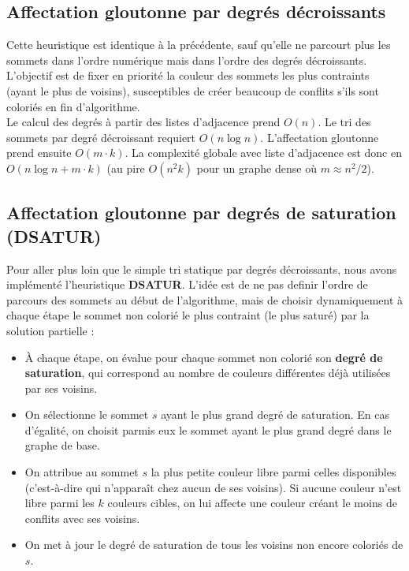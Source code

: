 \documentclass{article}
\begin{document}
\subsection{Affectation gloutonne par degrés décroissants}
Cette heuristique est identique à la précédente, sauf qu'elle ne parcourt plus les sommets dans l'ordre numérique mais dans l'ordre des degrés décroissants. L'objectif est de fixer en priorité la couleur des sommets les plus contraints (ayant le plus de voisins), susceptibles de créer beaucoup de conflits s'ils sont coloriés en fin d'algorithme.\\

Le calcul des degrés à partir des listes d'adjacence prend $O(n)$. Le tri des sommets par degré décroissant requiert $O(n \log n)$. L'affectation gloutonne prend ensuite $O(m \cdot k)$. La complexité globale avec liste d'adjacence est donc en $O(n \log n + m \cdot k)$ (au pire $O(n^2 k)$ pour un graphe dense où $m \approx n^2/2$).

\subsection{Affectation gloutonne par degrés de saturation (DSATUR)}
Pour aller plus loin que le simple tri statique par degrés décroissants, nous avons implémenté l'heuristique \textbf{DSATUR}. 
L'idée est de ne pas definir l'ordre de parcours des sommets au début de l'algorithme, mais de choisir dynamiquement à chaque étape le sommet non colorié le plus contraint (le plus saturé) par la solution partielle :
\begin{itemize}
    \item À chaque étape, on évalue pour chaque sommet non colorié son \textbf{degré de saturation}, qui correspond au nombre de couleurs différentes déjà utilisées par ses voisins.
    \item On sélectionne le sommet $s$ ayant le plus grand degré de saturation. En cas d'égalité, on choisit parmis eux le sommet ayant le plus grand degré dans le graphe de base.
    \item On attribue au sommet $s$ la plus petite couleur libre parmi celles disponibles (c'est-à-dire qui n'apparaît chez aucun de ses voisins). Si aucune couleur n'est libre parmi les $k$ couleurs cibles, on lui affecte une couleur créant le moins de conflits avec ses voisins.
    \item On met à jour le degré de saturation de tous les voisins non encore coloriés de $s$.\\
\end{itemize}
\end{document}
